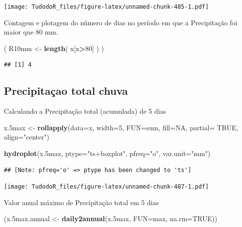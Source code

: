 \documentclass[
]{book}
\newenvironment{Shaded}{\begin{snugshade}}{\end{snugshade}}
\newcommand{\DataTypeTok}[1]{\textcolor[rgb]{0.13,0.29,0.53}{#1}}
\newcommand{\DecValTok}[1]{\textcolor[rgb]{0.00,0.00,0.81}{#1}}
\newcommand{\FloatTok}[1]{\textcolor[rgb]{0.00,0.00,0.81}{#1}}
\newcommand{\KeywordTok}[1]{\textcolor[rgb]{0.13,0.29,0.53}{\textbf{#1}}}
\newcommand{\NormalTok}[1]{#1}
\newcommand{\OperatorTok}[1]{\textcolor[rgb]{0.81,0.36,0.00}{\textbf{#1}}}
\newcommand{\OtherTok}[1]{\textcolor[rgb]{0.56,0.35,0.01}{#1}}
\newcommand{\StringTok}[1]{\textcolor[rgb]{0.31,0.60,0.02}{#1}}
\begin{document}
\texttt{[image: TudodoR\_files/figure-latex/unnamed-chunk-485-1.pdf]}

Contagem e plotagem do número de dias no período em que a Precipitação foi maior que 80 mm.

\begin{Shaded}
\begin{Highlighting}[]
\NormalTok{( R10mm <-}\StringTok{ }\KeywordTok{length}\NormalTok{( x[x}\OperatorTok{>}\DecValTok{80}\NormalTok{] ) )}
\end{Highlighting}
\end{Shaded}

\begin{verbatim}
## [1] 4
\end{verbatim}

\hypertarget{precipitauxe7ao-total-chuva}{%
\subsection{Precipitaçao total chuva}\label{precipitauxe7ao-total-chuva}}

Calculando a Precipitação total (acumulada) de 5 dias

\begin{Shaded}
\begin{Highlighting}[]
\NormalTok{x}\FloatTok{.5}\NormalTok{max <-}\StringTok{ }\KeywordTok{rollapply}\NormalTok{(}\DataTypeTok{data=}\NormalTok{x, }\DataTypeTok{width=}\DecValTok{5}\NormalTok{, }\DataTypeTok{FUN=}\NormalTok{sum, }\DataTypeTok{fill=}\OtherTok{NA}\NormalTok{, }\DataTypeTok{partial=} \OtherTok{TRUE}\NormalTok{,}
\DataTypeTok{align=}\StringTok{"center"}\NormalTok{)}

\KeywordTok{hydroplot}\NormalTok{(x}\FloatTok{.5}\NormalTok{max, }\DataTypeTok{ptype=}\StringTok{"ts+boxplot"}\NormalTok{, }\DataTypeTok{pfreq=}\StringTok{"o"}\NormalTok{, }\DataTypeTok{var.unit=}\StringTok{"mm"}\NormalTok{)}
\end{Highlighting}
\end{Shaded}

\begin{verbatim}
## [Note: pfreq='o' => ptype has been changed to 'ts']
\end{verbatim}

\texttt{[image: TudodoR\_files/figure-latex/unnamed-chunk-487-1.pdf]}

Valor anual máximo de Precipitação total em 5 dias

\begin{Shaded}
\begin{Highlighting}[]
\NormalTok{(x}\FloatTok{.5}\NormalTok{max.annual <-}\StringTok{ }\KeywordTok{daily2annual}\NormalTok{(x}\FloatTok{.5}\NormalTok{max, }\DataTypeTok{FUN=}\NormalTok{max, }\DataTypeTok{na.rm=}\OtherTok{TRUE}\NormalTok{))}
\end{Highlighting}
\end{Shaded}
\end{document}
